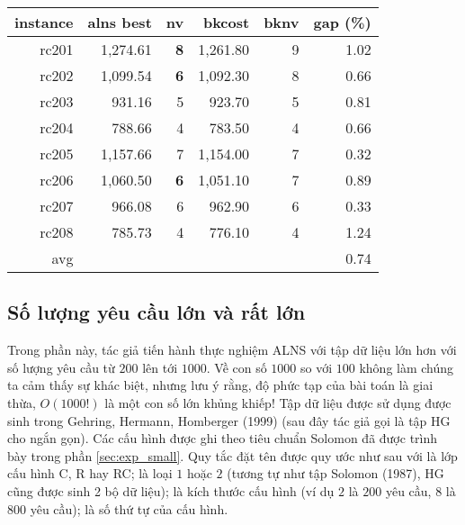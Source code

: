   \begin{table}[caption={Kết quả đo với tập Solomon RC2}, label=exp:solomonRC2, placement=h]
    \small
    \centering
    \begin{tabular}{rrrrrr}
    \hline
    instance & alns best & nv & bkcost & bknv & gap (\%) \\ \hline
    rc201 & 1,274.61 & \textbf{8} & 1,261.80 & 9 & 1.02 \\ \hline
    rc202 & 1,099.54 & \textbf{6} & 1,092.30 & 8 & 0.66 \\ \hline
    rc203 & 931.16 & 5 & 923.70 & 5 & 0.81 \\ \hline
    rc204 & 788.66 & 4 & 783.50 & 4 & 0.66 \\ \hline
    rc205 & 1,157.66 & 7 & 1,154.00 & 7 & 0.32 \\ \hline
    rc206 & 1,060.50 & \textbf{6} & 1,051.10 & 7 & 0.89 \\ \hline
    rc207 & 966.08 & 6 & 962.90 & 6 & 0.33 \\ \hline
    rc208 & 785.73 & 4 & 776.10 & 4 & 1.24 \\ \hline
    avg &  &  &  &  & 0.74 \\ \hline
    \end{tabular}
  \end{table}



  \subsection{Số lượng yêu cầu lớn và rất lớn}
  \label{sec:exp_large}
  
  Trong phần này, tác giả tiến hành thực nghiệm ALNS với tập dữ liệu lớn hơn với số lượng yêu cầu từ $200$ lên tới $1000$. Về con số $1000$ so với $100$ không làm chúng ta cảm thấy sự khác biệt, nhưng lưu ý rằng, độ phức tạp của bài toán là giai thừa, $O(1000!)$ là một con số lớn khủng khiếp! Tập dữ liệu được sử dụng được sinh trong Gehring, Hermann, Homberger (1999) \cite{gehring1999parallel} (sau đây tác giả gọi là tập HG cho ngắn gọn). Các cấu hình được ghi theo tiêu chuẩn Solomon đã được trình bày trong phần \ref{sec:exp_small}. Quy tắc đặt tên được quy ước như sau  với  là lớp cấu hình C, R hay RC;  là loại $1$ hoặc $2$ (tương tự như tập Solomon (1987), HG cũng được sinh 2 bộ dữ liệu);  là kích thước cấu hình (ví dụ $2$ là $200$ yêu cầu, $8$ là $800$ yêu cầu);  là số thứ tự của cấu hình.

